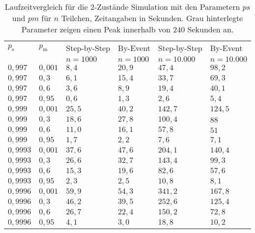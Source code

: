\begin{table}[h]
\centering
\caption[Laufzeitvergleich für die 2-Zustände Simulation]{Laufzeitvergleich für die 2-Zustände Simulation mit den Parametern $ps$ und $pm$ für $n$ Teilchen, Zeitangaben in Sekunden. Grau hinterlegte Parameter zeigen einen Peak innerhalb von $240$ Sekunden an.}
\label{2s_laufzeit}
\begin{tabular}{|l|l||l|l|l|l|} \hline
$p_\text{s}$ & $p_\text{m}$  & Step-by-Step & By-Event & Step-by-Step & By-Event \\ 
 &   & $n=1000$ &$n=1000$ &$n=10.000$ &$n=10.000$  \\ \hline \hline
$0,997  $ & $ 0,001 $ & $ 8,4  $ & $ 20,9  $ & $ 47,4  $ & $98,2  $\\ \hline
$0,997  $ & $ 0,3  $ & $ 6,1  $ & $ 15,4  $ & $ 33,7  $ & $69,3  $\\ \hline
$0,997  $ & $ 0,6  $ & $ 3,6  $ & $ 8,9   $  & $ 19,4 $ & $40,1  $\\ \hline
$0,997  $ & $ 0,95 $ & $ 0,6  $ & $ 1,3   $  & $ 2,6  $ & $5,4   $\\ \hline
$0,999  $ & $ 0,001 $ & $ 25,5 $ & $ 40,2  $ & $ 142,7 $ & $124,5 $\\ \hline
$0,999  $ & $ 0,3  $ & $ 18,6 $ & $ 27,8  $ & $ 100,4 $ & $88    $\\ \hline
$0,999  $ & $ 0,6  $ & $ 11,0 $ & $ 16,1  $ & $ 57,8  $ & $51    $\\ \hline
$0,999  $ & $ 0,95 $ & $ 1,7  $ & $ 2,2   $ & $ 7,6   $ & $7,1   $\\ \hline
$0,9993 $ & $ 0,001 $ & $ 37,6 $ & $ 47,6  $ & $ 204,1 $ & $140,4 $\\ \hline
$0,9993 $ & $ 0,3  $ & $ 26,6 $ & $ 32,7  $ & $ 143,4 $ & $99,3  $\\ \hline
$0,9993 $ & $ 0,6  $ & $ 15,3 $ & $ 19,6  $ & $ 82,6  $ & $57,6  $\\ \hline
$0,9993 $ & $ 0,95 $ & $ 2,3  $ & $ 2,5   $ & $ 10,8  $ & $8,1   $\\ \hline
\cellcolor{gray!25}$0,9996 $ &\cellcolor{gray!25} $ 0,001 $ & $ 59,9$ & $ 54,3 $ & $341,2 $ & $167,8$\\ \hline
$0,9996 $ & $ 0,3  $ & $ 46,2 $ & $ 39,5  $ & $ 252,6 $ & $125,4 $\\ \hline
$0,9996 $ & $ 0,6  $ & $ 26,7 $ & $ 22,4  $ & $ 150,2 $ & $72,8  $\\ \hline
$0,9996 $ & $ 0,95 $ & $ 4,1  $ & $ 3,0   $ & $ 18,8  $ & $10,2  $\\ \hline
\end{tabular}
\end{table}

